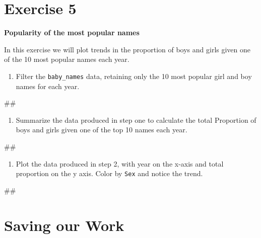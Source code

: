 \documentclass[]{book}
\newenvironment{Shaded}{\begin{snugshade}}{\end{snugshade}}
\newcommand{\NormalTok}[1]{#1}
\providecommand{\tightlist}{%
  \setlength{\itemsep}{0pt}\setlength{\parskip}{0pt}}
\begin{document}
\section{Exercise 5}\label{exercise-5}

\textbf{Popularity of the most popular names}

In this exercise we will plot trends in the proportion of boys and girls
given one of the 10 most popular names each year.

\begin{enumerate}
\def\labelenumi{\arabic{enumi}.}
\tightlist
\item
  Filter the \texttt{baby\_names} data, retaining only the 10 most
  popular girl and boy names for each year.
\end{enumerate}

\begin{Shaded}
\begin{Highlighting}[]
\NormalTok{##}
\end{Highlighting}
\end{Shaded}

\begin{enumerate}
\def\labelenumi{\arabic{enumi}.}
\setcounter{enumi}{1}
\tightlist
\item
  Summarize the data produced in step one to calculate the total
  Proportion of boys and girls given one of the top 10 names each year.
\end{enumerate}

\begin{Shaded}
\begin{Highlighting}[]
\NormalTok{##}
\end{Highlighting}
\end{Shaded}

\begin{enumerate}
\def\labelenumi{\arabic{enumi}.}
\setcounter{enumi}{2}
\tightlist
\item
  Plot the data produced in step 2, with year on the x-axis and total
  proportion on the y axis. Color by \texttt{Sex} and notice the trend.
\end{enumerate}

\begin{Shaded}
\begin{Highlighting}[]
\NormalTok{##}
\end{Highlighting}
\end{Shaded}

\section{Saving our Work}\label{saving-our-work}
\end{document}
